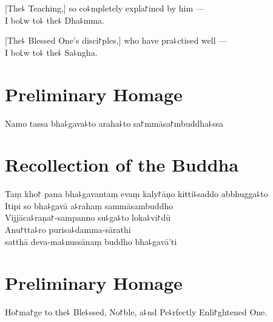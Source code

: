 [The꜕ Teaching,] so co꜕mpletely expla꜓ined by him ---\\
I bo꜖w to꜕ the꜕ Dha꜕mma. 

[The꜕ Blessed One's disci꜓ples,] who have pra꜕ctised well ---\\
I bo꜖w to꜕ the꜕ Sa꜕ngha. 

\clearpage

\chapter*{Preliminary Homage}%

\begin{leader}
\end{leader}

Namo tassa bha꜕gava꜕to araha꜕to sa꜓mmāsa꜓mbuddha꜕ssa


\chapter*{Recollection of the Buddha}%

\delegateSetUseNext

\begin{leader}
\end{leader}

Taṃ kho꜓ pana bha꜕gavantaṃ evaṃ kaly꜓āṇo kitti꜕saddo abbhugga꜕to\\
Itipi so bha꜕gavā a꜕rahaṃ sammāsambuddho\\
Vijjāca꜕raṇa꜓-sampanno su꜕ga꜕to loka꜕vi꜓dū\\
Anu꜓tta꜕ro purisa꜕damma-sārathi\\
\vin satthā deva-ma꜕nussānaṃ buddho bha꜕gavā'ti

\clearpage

\chapter{Preliminary Homage}%

\begin{leader}
\end{leader}

Ho꜓ma꜓ge to the꜕ Ble꜕ssed, No꜓ble, a꜕nd Pe꜕rfectly Enli꜓ghtened One.

